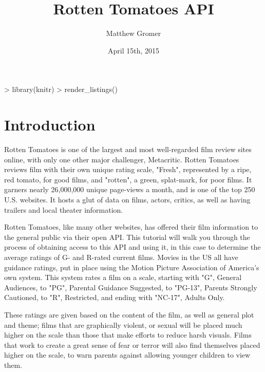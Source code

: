 \documentclass{article}
\begin{document}

\lstset{breaklines=true} %
\begin{Schunk}
\begin{Sinput}
> library(knitr)
> render_listings()
\end{Sinput}
\end{Schunk}

\title{Rotten Tomatoes API}
\date{April 15th, 2015}
\author{Matthew Gromer}
\maketitle

\section*{Introduction}
Rotten Tomatoes is one of the largest and most well-regarded film review sites online, with only one other major challenger, Metacritic. Rotten Tomatoes reviews film with their own unique rating scale, "Fresh", represented by a ripe, red tomato, for good films, and "rotten", a green, splat-mark, for poor films. It garners nearly 26,000,000 unique page-views a month, and is one of the top 250 U.S. websites. 
It hosts a glut of data on films, actors, critics, as well as having trailers and local theater information.

Rotten Tomatoes, like many other websites, has offered their film information to the general public via their open API. This tutorial will walk you through the process of obtaining access to this API and using it, in this case to determine the average ratings of G- and R-rated current films. Movies in the US all have guidance ratings, put in place using the Motion Picture Association of America's own system. This system rates a film on a scale, starting with "G", General Audiences, to "PG", Parental Guidance Suggested, to "PG-13", Parents Strongly Cautioned, to "R", Restricted, and ending with "NC-17", Adults Only. 

These ratings are given based on the content of the film, as well as general plot and theme; films that are graphically violent, or sexual will be placed much higher on the scale than those that make efforts to reduce harsh visuals. Films that work to create a great sense of fear or terror will also find themselves placed higher on the scale, to warn parents against allowing younger children to view them.
\end{document}
